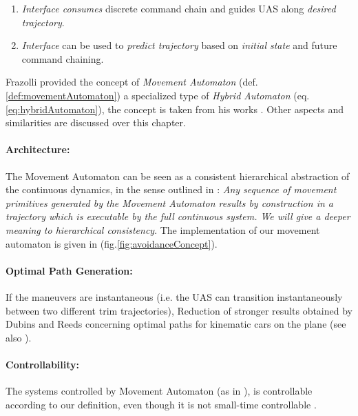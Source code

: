 \begin{enumerate}

    \item \emph{Interface consumes} discrete command chain and guides UAS along \emph{desired trajectory}.
    
    \item \emph{Interface} can be used to \emph{predict trajectory} based on \emph{initial state} and future command chaining. 
\end{enumerate}

Frazolli provided the concept of \emph{Movement Automaton} (def. \ref{def:movementAutomaton}) a specialized type of \emph{Hybrid Automaton} (eq. \ref{eq:hybridAutomaton}), the concept is taken from his works \cite{frazzoli2001robust,frazzoli2000trajectory}. Other aspects and similarities are discussed over this chapter. 


\paragraph{Architecture:} The Movement Automaton can be seen as a consistent hierarchical abstraction of the continuous dynamics, in the sense outlined in \cite{pappas2000hierarchically}: \emph{Any sequence of movement primitives generated by the Movement Automaton results by construction in a trajectory which is executable by the full continuous system. We will give a deeper meaning to hierarchical consistency}. The implementation of our movement automaton is given in (fig.\ref{fig:avoidanceConcept}). 

\paragraph{Optimal Path Generation:} If the maneuvers are instantaneous (i.e. the UAS can transition instantaneously between two different trim trajectories), Reduction of stronger results obtained by Dubins \cite{dubins1957curves} and Reeds \cite{reeds1990optimal} concerning optimal paths for kinematic cars on the plane (see also \cite{soueres1998optimal}). 

\paragraph{Controllability:} The systems controlled by Movement Automaton (as in \cite{lavalle1998rapidly}), is controllable according to our definition, even though it is not
small-time controllable \cite{sussmann1983lie}.

